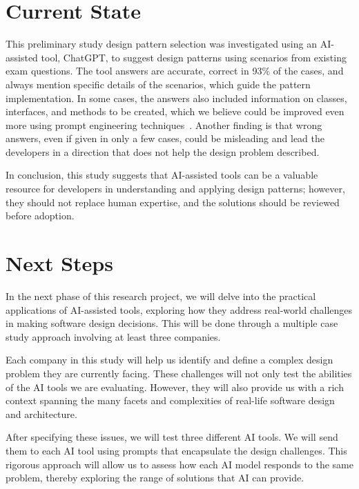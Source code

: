\section{Current State}\label{sec:current-state}

This preliminary study design pattern selection was investigated using an AI-assisted tool, ChatGPT, to suggest design patterns using scenarios from existing exam questions. The tool answers are accurate, correct in 93\% of the cases, and always mention specific details of the scenarios, which guide the pattern implementation. In some cases, the answers also included information on classes, interfaces, and methods to be created, which we believe could be improved even more using prompt engineering techniques~\cite{White2023}. Another finding is that wrong answers, even if given in only a few cases, could be misleading and lead the developers in a direction that does not help the design problem described. 

In conclusion, this study suggests that AI-assisted tools can be a valuable resource for developers in understanding and applying design patterns; however, they should not replace human expertise, and the solutions should be reviewed before adoption.

\section{Next Steps}\label{sec:next-steps}

In the next phase of this research project, we will delve into the practical applications of AI-assisted tools, exploring how they address real-world challenges in making software design decisions. This will be done through a multiple case study approach involving at least three companies.

Each company in this study will help us identify and define a complex design problem they are currently facing. These challenges will not only test the abilities of the AI tools we are evaluating. However, they will also provide us with a rich context spanning the many facets and complexities of real-life software design and architecture.

After specifying these issues, we will test three different AI tools. We will send them to each AI tool using prompts that encapsulate the design challenges. This rigorous approach will allow us to assess how each AI model responds to the same problem, thereby exploring the range of solutions that AI can provide.


